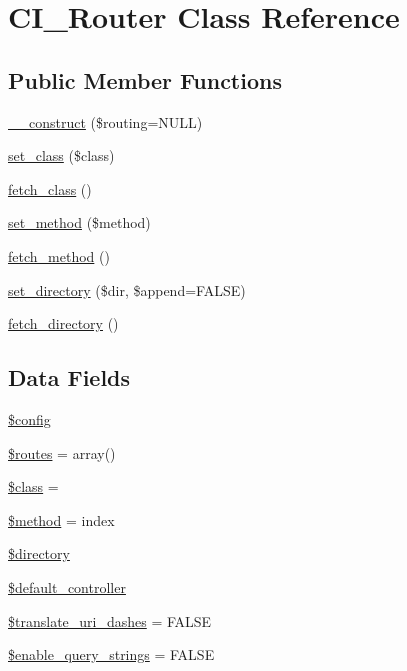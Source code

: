 \hypertarget{class_c_i___router}{}\section{C\+I\+\_\+\+Router Class Reference}
\label{class_c_i___router}
\subsection*{Public Member Functions}
\begin{DoxyCompactItemize}
\item 
\mbox{\hyperlink{class_c_i___router_a9b81050c9907794a374f5088743a0252}{\+\_\+\+\_\+construct}} (\$routing=N\+U\+LL)
\item 
\mbox{\hyperlink{class_c_i___router_afbb540df5c161fe69909a5f8182f910f}{set\+\_\+class}} (\$class)
\item 
\mbox{\hyperlink{class_c_i___router_af5586c3f514021e9e2588e102620d237}{fetch\+\_\+class}} ()
\item 
\mbox{\hyperlink{class_c_i___router_a6a42036a115946acdaf0975c994106fb}{set\+\_\+method}} (\$method)
\item 
\mbox{\hyperlink{class_c_i___router_ad408b28e3a095e7435f21e95d93e7714}{fetch\+\_\+method}} ()
\item 
\mbox{\hyperlink{class_c_i___router_a80573f758526ffa1beba61be5d45baff}{set\+\_\+directory}} (\$dir, \$append=F\+A\+L\+SE)
\item 
\mbox{\hyperlink{class_c_i___router_a7a089f2cfae731dcc9e59a71d20208ef}{fetch\+\_\+directory}} ()
\end{DoxyCompactItemize}
\subsection*{Data Fields}
\begin{DoxyCompactItemize}
\item 
\mbox{\hyperlink{class_c_i___router_a49c7011be9c979d9174c52a8b83e5d8e}{\$config}}
\item 
\mbox{\hyperlink{class_c_i___router_a8f7eb04a54e0f0bfc0cedeb9899ce4a8}{\$routes}} = array()
\item 
\mbox{\hyperlink{class_c_i___router_a252ba022809910ea710a068fc1bab657}{\$class}} = \textquotesingle{}\textquotesingle{}
\item 
\mbox{\hyperlink{class_c_i___router_a12661b2fc0f57f97e30a1620889ce9c6}{\$method}} = \textquotesingle{}index\textquotesingle{}
\item 
\mbox{\hyperlink{class_c_i___router_a1b07c630eb02f770a082a013373a16d6}{\$directory}}
\item 
\mbox{\hyperlink{class_c_i___router_ab949cccd963058f0937d04bc26ee24a7}{\$default\+\_\+controller}}
\item 
\mbox{\hyperlink{class_c_i___router_a9693c124c7019ed8ec57166661044ba2}{\$translate\+\_\+uri\+\_\+dashes}} = F\+A\+L\+SE
\item 
\mbox{\hyperlink{class_c_i___router_a8495f59271097c83f7703d433d96ff6d}{\$enable\+\_\+query\+\_\+strings}} = F\+A\+L\+SE
\end{DoxyCompactItemize}
